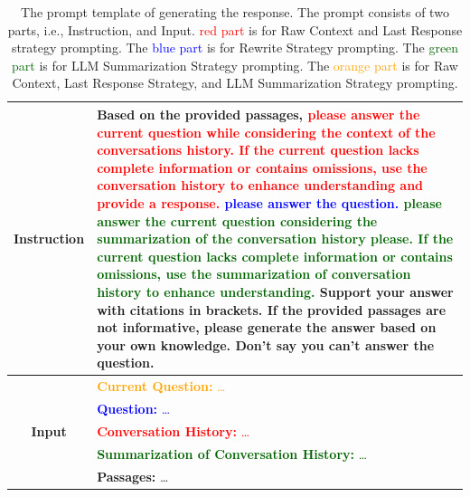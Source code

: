\documentclass[11pt]{article}
\begin{document}

\begin{table}[hb]
\centering
\begin{tabular}{c p{12cm}}
\toprule
\multirow{10}{*}{\textbf{Instruction}} & Based on the provided passages, 
\textcolor{red}{please answer the current question while considering the context of the conversations history. If the current question lacks complete information or contains omissions, use the conversation history to enhance understanding and provide a response.} 
\textcolor{blue}{please answer the question.}
\textcolor{darkgreen}{please answer the current question considering the summarization of the conversation history please. If the current question lacks complete information or contains omissions, use the summarization of conversation history to enhance understanding.}
Support your answer with citations in brackets. If the provided passages are not informative, please generate the answer based on your own knowledge. Don't say you can't answer the question.\\  

\midrule

\multirow{5}{*}{\textbf{Input}} 
& \textcolor{orange}{\textbf{Current Question:} \dots}\\
& \textcolor{blue}{\textbf{Question:} \dots}\\
& \textcolor{red}{\textbf{Conversation History:} \dots} \\
& \textcolor{darkgreen}{\textbf{Summarization of Conversation History:} \dots} \\
&\textbf{Passages:} \dots \\





\bottomrule

\end{tabular}
\caption{The prompt template of generating the response. The prompt consists of two parts, i.e., Instruction, and Input.
\textcolor{red}{red part} is for Raw Context and Last Response strategy prompting. 
The \textcolor{blue}{blue part} is for Rewrite Strategy prompting. 
The \textcolor{darkgreen}{green part} is for LLM Summarization Strategy prompting.
The \textcolor{orange}{orange part} is for Raw Context, Last Response Strategy, and LLM Summarization Strategy prompting.}
\label{prompt_of_generating_reseponses_with_citation_labeling}
\end{table}
\end{document}

